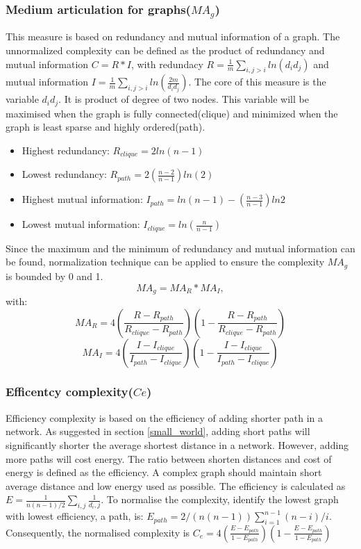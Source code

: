 \documentclass[12pt]{article}
\begin{document}
\subsubsection{Medium articulation for graphs($MA_g$)}
\label{magdefinition}
This measure is based on redundancy and mutual information of a graph.\cite{wilhelm2007information} The unnormalized complexity can be defined as the product of redundancy and mutual information $C=R*I$, with redundacy $R=\frac{1}{m}\sum_{i,j>i}ln(d_id_j)$ and mutual information $I=\frac{1}{m}\sum_{i,j>i}ln(\frac{2m}{d_id_j})$. The core of this measure is the variable $d_id_j$. It is product of degree of two nodes. This variable will be maximised when the graph is fully connected(clique) and minimized when the graph is least sparse and highly ordered(path).
\begin{itemize}
    \item Highest redundancy: $R_{clique} = 2ln(n-1)$
    \item Lowest redundancy: $R_{path} = 2(\frac{n-2}{n-1})ln(2)$
    \item Highest mutual information: $I_{path} = ln(n-1)-(\frac{n-3}{n-1})ln2$
    \item Lowest mutual information: $I_{clique}=ln(\frac{n}{n-1})$
\end{itemize}
\par
Since the maximum and the minimum of redundancy and mutual information can be found, normalization technique can be applied to ensure the complexity $MA_g$ is bounded by 0 and 1.
\begin{equation}
    MA_g=MA_R*MA_I,
\end{equation}
with:
\begin{equation}
    MA_R=4(\frac{R-R_{path}}{R_{clique}-R_{path}})(1-\frac{R-R_{path}}{R_{clique}-R_{path}})
\end{equation}
\begin{equation}
    MA_I=4(\frac{I-I_{clique}}{I_{path}-I_{clique}})(1-\frac{I-I_{clique}}{I_{path}-I_{clique}})
\end{equation}
\subsubsection{Efficentcy complexity($Ce$)}
Efficiency complexity is based on the efficiency of adding shorter path in a network.\cite{latora2003economic} As suggested in section \ref{small_world}, adding short paths will significantly shorter the average shortest distance in a network. However, adding more paths will cost energy. The ratio between shorten distances and cost of energy is defined as the efficiency. A complex graph should maintain short average distance and low energy used as possible. The efficiency is calculated as $E=\frac{1}{n(n-1)/2}\sum_{i,j}\frac{1}{d_i,j}$. To normalise the complexity, identify the lowest graph with lowest efficiency, a path, is: $E_{path} = 2/(n(n-1))\sum_{i=1}^{n-1}(n-i)/i$. Consequently, the normalised complexity is $C_e=4(\frac{E-E_{path}}{1-E_{path}})(1-\frac{E-E_{path}}{1-E_{path}})$
\end{document}

